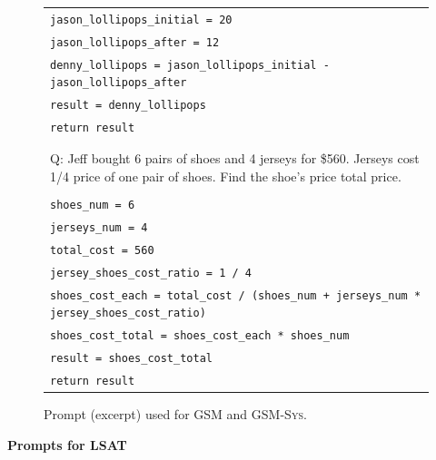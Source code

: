 \documentclass{article}
\theoremstyle{definition}
\newcommand{\gsm}{\textsc{GSM}}
\newcommand{\gsmsys}{\textsc{GSM-Sys}}
\newcommand{\lsat}{\textsc{LSAT}}
\begin{document}
\begin{figure}[h]
\begin{tabularx}{\linewidth}{X}
\\
\tt    jason\_lollipops\_initial = 20 \\
\tt    jason\_lollipops\_after = 12 \\
 \tt   denny\_lollipops = jason\_lollipops\_initial - jason\_lollipops\_after \\
 \tt   result = denny\_lollipops \\
  \tt  return result \\
\\
\\
Q: Jeff bought 6 pairs of shoes and 4 jerseys for \$560. Jerseys cost 1/4 price of one pair of shoes. Find the shoe's price total price. \\
\\
\tt    shoes\_num = 6 \\
 \tt   jerseys\_num = 4 \\
 \tt   total\_cost = 560 \\
 \tt   jersey\_shoes\_cost\_ratio = 1 / 4 \\
 \tt   shoes\_cost\_each = total\_cost / (shoes\_num + jerseys\_num * jersey\_shoes\_cost\_ratio) \\

\tt    shoes\_cost\_total = shoes\_cost\_each * shoes\_num \\
\tt    result = shoes\_cost\_total \\
\tt    return result \\
\bottomrule
    \end{tabularx}
    \caption{Prompt (excerpt) used for \gsm{} and \gsmsys{}.  }
\end{figure}

\newpage
\textbf{Prompts for \lsat{}}
\end{document}
